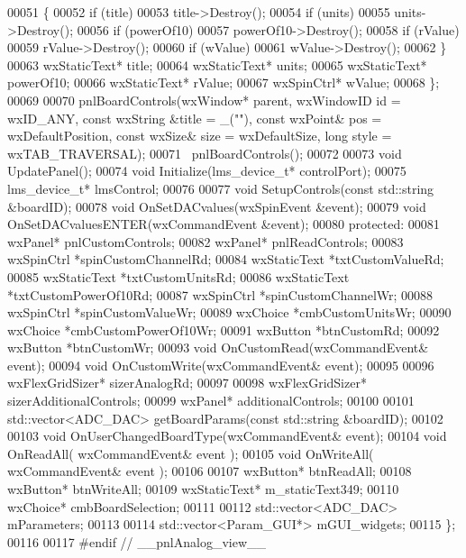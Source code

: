 \begin{DoxyCode}
00051             \{
00052                 \textcolor{keywordflow}{if} (title)
00053                     title->Destroy();
00054                 \textcolor{keywordflow}{if} (units)
00055                     units->Destroy();
00056                 \textcolor{keywordflow}{if} (powerOf10)
00057                     powerOf10->Destroy();
00058                 \textcolor{keywordflow}{if} (rValue)
00059                     rValue->Destroy();
00060                 \textcolor{keywordflow}{if} (wValue)
00061                     wValue->Destroy();
00062             \}
00063             wxStaticText* title;
00064             wxStaticText* units;
00065             wxStaticText* powerOf10;
00066             wxStaticText* rValue;
00067             wxSpinCtrl* wValue;
00068         \};
00069 
00070         pnlBoardControls(wxWindow* parent, wxWindowID \textcolor{keywordtype}{id} = wxID\_ANY, \textcolor{keyword}{const} wxString &title = \_(\textcolor{stringliteral}{""}), \textcolor{keyword}{const} 
      wxPoint& pos = wxDefaultPosition, \textcolor{keyword}{const} wxSize& size = wxDefaultSize, \textcolor{keywordtype}{long} style = wxTAB\_TRAVERSAL);
00071         ~pnlBoardControls();
00072 
00073         \textcolor{keywordtype}{void} UpdatePanel();
00074         \textcolor{keywordtype}{void} Initialize(lms_device_t* controlPort);
00075         lms_device_t* lmsControl;
00076 
00077         \textcolor{keywordtype}{void} SetupControls(\textcolor{keyword}{const} std::string &boardID);
00078         \textcolor{keywordtype}{void} OnSetDACvalues(wxSpinEvent &event);
00079         \textcolor{keywordtype}{void} OnSetDACvaluesENTER(wxCommandEvent &event);
00080     \textcolor{keyword}{protected}:
00081         wxPanel* pnlCustomControls;
00082         wxPanel* pnlReadControls;
00083         wxSpinCtrl *spinCustomChannelRd;
00084         wxStaticText *txtCustomValueRd;
00085         wxStaticText *txtCustomUnitsRd;
00086         wxStaticText *txtCustomPowerOf10Rd;
00087         wxSpinCtrl *spinCustomChannelWr;
00088         wxSpinCtrl *spinCustomValueWr;
00089         wxChoice *cmbCustomUnitsWr;
00090         wxChoice *cmbCustomPowerOf10Wr;
00091         wxButton *btnCustomRd;
00092         wxButton *btnCustomWr;
00093         \textcolor{keywordtype}{void} OnCustomRead(wxCommandEvent& event);
00094         \textcolor{keywordtype}{void} OnCustomWrite(wxCommandEvent& event);
00095 
00096         wxFlexGridSizer* sizerAnalogRd;
00097 
00098         wxFlexGridSizer* sizerAdditionalControls;
00099         wxPanel* additionalControls;
00100 
00101         std::vector<ADC\_DAC> getBoardParams(\textcolor{keyword}{const} std::string &boardID);
00102 
00103         \textcolor{keywordtype}{void} OnUserChangedBoardType(wxCommandEvent& event);
00104         \textcolor{keywordtype}{void} OnReadAll( wxCommandEvent& event );
00105         \textcolor{keywordtype}{void} OnWriteAll( wxCommandEvent& event );
00106 
00107         wxButton* btnReadAll;
00108         wxButton* btnWriteAll;
00109         wxStaticText* m_staticText349;
00110         wxChoice* cmbBoardSelection;
00111 
00112         std::vector<ADC\_DAC> mParameters;
00113 
00114         std::vector<Param\_GUI*> mGUI_widgets;
00115 \};
00116 
00117 \textcolor{preprocessor}{#endif // \_\_pnlAnalog\_view\_\_}
\end{DoxyCode}

